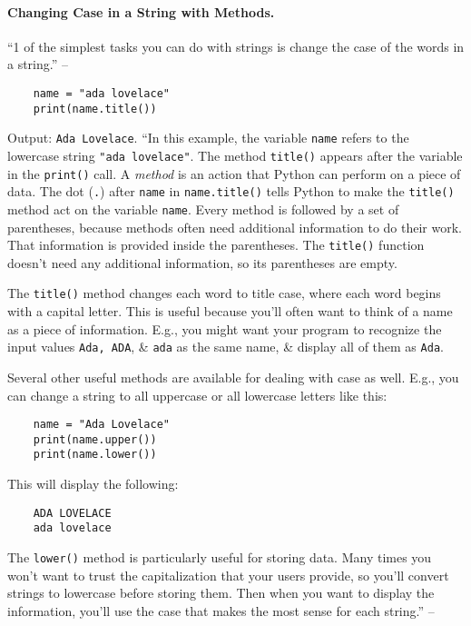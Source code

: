 \documentclass[oneside]{book}
\numberwithin{equation}{section}
\begin{document}
\paragraph{Changing Case in a String with Methods.} ``1 of the simplest tasks you can do with strings is change the case of the words in a string.'' -- \cite[p. 20]{Matthes2019}
\begin{verbatim}
	name = "ada lovelace"
	print(name.title())
\end{verbatim}
Output: \texttt{Ada Lovelace}. ``In this example, the variable \texttt{name} refers to the lowercase string \texttt{"ada lovelace"}. The method \texttt{title()} appears after the variable in the \texttt{print()} call. A \textit{method} is an action that Python can perform on a piece of data. The dot (\texttt{.}) after \texttt{name} in \texttt{name.title()} tells Python to make the \texttt{title()} method act on the variable \texttt{name}. Every method is followed by a set of parentheses, because methods often need additional information to do their work. That information is provided inside the parentheses. The \texttt{title()} function doesn't need any additional information, so its parentheses are empty.

The \texttt{title()} method changes each word to title case, where each word begins with a capital letter. This is useful because you'll often want to think of a name as a piece of information. E.g., you might want your program to recognize the input values \texttt{Ada, ADA}, \& \texttt{ada} as the same name, \& display all of them as \texttt{Ada}.

Several other useful methods are available for dealing with case as well. E.g., you can change a string to all uppercase or all lowercase letters like this:
\begin{verbatim}
	name = "Ada Lovelace"
	print(name.upper())
	print(name.lower())
\end{verbatim}
This will display the following:
\begin{verbatim}
	ADA LOVELACE
	ada lovelace
\end{verbatim}
The \texttt{lower()} method is particularly useful for storing data. Many times you won't want to trust the capitalization that your users provide, so you'll convert strings to lowercase before storing them. Then when you want to display the information, you'll use the case that makes the most sense for each string.'' -- \cite[p. 20]{Matthes2019}
\end{document}
